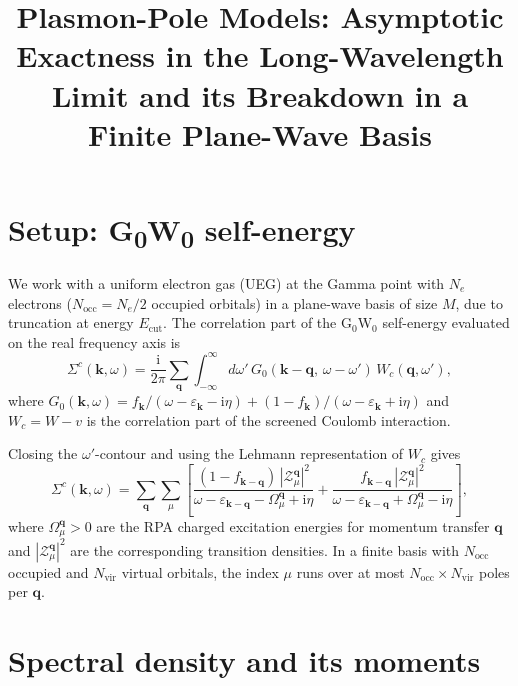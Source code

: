 \documentclass[11pt]{article}
\newcommand{\bq}{\mathbf{q}}
\newcommand{\bk}{\mathbf{k}}
\newcommand{\Om}{\Omega}
\newcommand{\eps}{\varepsilon}
\newcommand{\Sig}{\Sigma}
\newcommand{\ii}{\mathrm{i}}
\begin{document}
\title{Plasmon-Pole Models: Asymptotic Exactness in the Long-Wavelength Limit
       and its Breakdown in a Finite Plane-Wave Basis}
\author{}
\date{}
\maketitle

\section{Setup: G\textsubscript{0}W\textsubscript{0} self-energy}

We work with a uniform electron gas (UEG) at the Gamma point with $N_e$ electrons ($N_\text{occ}=N_e/2$
occupied orbitals) in a plane-wave basis of size $M$, due to truncation at energy $E_\text{cut}$. The correlation part of the G$_0$W$_0$ self-energy evaluated on the real
frequency axis is
\begin{equation}
  \Sig^c(\bk,\omega)
  = \frac{\ii}{2\pi}\sum_{\bq}\int_{-\infty}^{\infty}d\omega'\,
    G_0(\bk-\bq,\,\omega-\omega')\,W_c(\bq,\omega'),
  \label{eq:gw-def}
\end{equation}
where $G_0(\bk,\omega)=f_\bk/(\omega-\eps_\bk-\ii\eta)+(1-f_\bk)/(\omega-\eps_\bk+\ii\eta)$
and $W_c=W-v$ is the correlation part of the screened Coulomb interaction.

Closing the $\omega'$-contour and using the Lehmann representation
of $W_c$ gives
\begin{equation}
  \Sig^c(\bk,\omega)
  = \sum_{\bq}\sum_\mu
    \left[
      \frac{(1-f_{\bk-\bq})\,|\mathcal{Z}^{\bq}_\mu|^2}
           {\omega - \eps_{\bk-\bq} - \Om_\mu^{\bq} + \ii\eta}
     +\frac{f_{\bk-\bq}\,|\mathcal{Z}^{\bq}_\mu|^2}
           {\omega - \eps_{\bk-\bq} + \Om_\mu^{\bq} - \ii\eta}
    \right],
  \label{eq:gw-exact}
\end{equation}
where $\Om_\mu^{\bq}>0$ are the RPA charged excitation energies for momentum
transfer $\bq$ and $|\mathcal{Z}^{\bq}_\mu|^2$ are the corresponding
transition densities.
In a finite basis with $N_\text{occ}$ occupied and $N_\text{vir}$ virtual
orbitals, the index $\mu$ runs over at most $N_\text{occ}\times N_\text{vir}$
poles per $\bq$.

\section{Spectral density and its moments}
\end{document}
